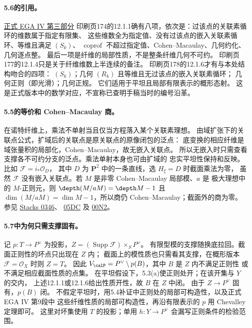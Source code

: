 \documentclass[UTF8,a4paper]{ctexbook}
\newcommand{\OO}{\mathscr O}
\DeclareMathOperator{\Supp}{Supp}
\DeclareMathOperator{\coprof}{coprof}
\newcommand{\FF}{\mathcal F}
\begin{document}
\paragraph{5.6的引用。}
\href{https://www.numdam.org/item/PMIHES_1966__28__5_0/}{正式 EGA IV 第三部分}
印刷页174的12.1.1确有八项，依次是：过该点的关联素循环的维数属于指定有限集、
这些维数全为指定值、没有过该点的嵌入关联素循环、等维且满足 $(S_k)$、
$\coprof$ 不超过指定值、Cohen--Macaulay、几何约化、几何逐点整。
最后一项是纤维的局部性质，不是整条纤维几何不可约。
印刷页177的12.1.4只是关于纤维维数上半连续的备注。
印刷页178的12.1.6才有与本处结构吻合的四项：
$(S_k)$；几何 $(R_k)$ 且等维且无过该点的嵌入关联素循环；
几何正则（即光滑）；几何正规。
它们适用于平坦且局部有限表示的概形态射。
这是正式版本中的数学对应，不宣称已查明手稿当时的编号沿革。

\paragraph{5.5的等价和 Cohen--Macaulay 商。}
在诺特纤维上，乘法不单射当且仅当方程落入某个关联素理想。
由域扩张下的关联点公式，扩域后的关联点是原关联点的原像闭包的泛点：
底变换的相应纤维是域张量积的局部化，Cohen--Macaulay，故无嵌入关联点。
所以无嵌入时只需查看支撑各不可约分支的泛点。乘法单射本身也可由扩域的
忠实平坦性保持和反映。比如 $\FF=i_*\OO_D$，
其中 $D$ 为 $\mathbf P^2$ 中的一条直线，选 $H_\xi=D$ 时截面乘法为零，
虽然 $\FF$ 没有嵌入关联点。若 $M$ 是非零 Cohen--Macaulay 局部模、$a$ 是
极大理想中的 $M$-正则元，则 $\depth(M/aM)=\depth M-1$ 且
$\dim(M/aM)=\dim M-1$，所以商仍 Cohen--Macaulay；截面外的商为零。
参见 \href{https://stacks.math.columbia.edu/tag/0346}{Stacks 0346}、
\href{https://stacks.math.columbia.edu/tag/05DC}{05DC} 及
\href{https://stacks.math.columbia.edu/tag/00N2}{00N2}。

\paragraph{5.7中为何只需支撑固有。}
记 $p:T\to P^\vee$ 为投影，$Z=(\Supp\FF)\times_S P^\vee$。
有限型模的支撑随换底拉回。截面正则性的坏点只出现在 $Z$ 内；
截面上的模性质也只需看其支撑，在概形版本 $\FF=\OO_X$ 时则 $Z=T$。
因此 $V_{\calP}=P^\vee\setminus p(B)$，其中 $B$ 是 $Z$ 内不满足正则性
或不满足相应截面性质的点集。
在平坦假设下，5.3(a)使正则处开；在该开集与 $Y$ 的交内，
上述12.1.1或12.1.6给出性质开性，故 $B$ 在 $Z$ 中闭。
由于 $Z\to P^\vee$ 固有，$p(B)$ 闭。
不假定平坦时，用5.4补证中正则处的局部可构造性，以及正式 EGA IV 第9段中
这些纤维性质的局部可构造性，再沿有限表示的 $p$ 用 Chevalley 定理即可。
这里对坏集使用 $T$ 的投影；单用 $h:Y\to P^\vee$ 会漏写正则条件的检验范围。
\end{document}
